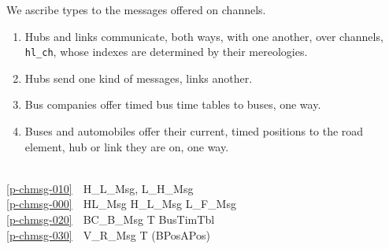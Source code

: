 \mnewfoil

\pos{\vspace{2mm}}{}
 
\noindent
{}

\label{p-mono.Channels}\label{p-kap6.Channels}


\begynd
\pind We ascribe types to the messages offered on channels. 
\begin{enumerate}\setei
\item \label{p-chmsg-000} Hubs and links communicate, both ways, with
                        one another, over channels, \texttt{hl\_ch},
                        whose indexes are determined by their mereologies.
\item \label{p-chmsg-010} Hubs send one kind of messages, links another.
\item \label{p-chmsg-020} Bus companies offer timed bus time tables to
                        buses, one way.
\item \label{p-chmsg-030} Buses and automobiles offer their current,
                        timed positions to the road element, hub or
                        link they are on, one way. 
\savei\end{enumerate}\footsize
\afslut

\LLLL %

\bp
{}\\
\ref{p-chmsg-010}\ \ H\_L\_Msg, L\_H\_Msg \\
\ref{p-chmsg-000}\ \ HL\_Msg {\EQ} H\_L\_Msg {\BAR} L\_F\_Msg \\
\ref{p-chmsg-020}\ \ BC\_B\_Msg {\EQ} T {\TIMES} BusTimTbl \\
\ref{p-chmsg-030}\ \ V\_R\_Msg {\EQ} T {\TIMES} (BPos{\BAR}APos) 
\ep
\smallish


